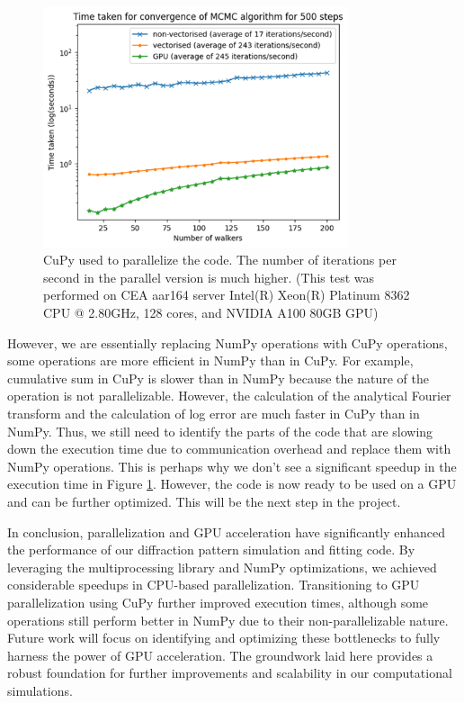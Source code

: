 \begin{figure}[h]
    \centering
    \includegraphics[width=0.8\textwidth]{images/gpu.png}
    \caption{CuPy used to parallelize the code. The number of iterations per second in the parallel version is much higher. (This test was performed 
    on CEA aar164 server Intel(R) Xeon(R) Platinum 8362 CPU @ 2.80GHz, 128 cores, and NVIDIA A100 80GB GPU)}
    \label{fig:cupy}
\end{figure}

\FloatBarrier

However, we are essentially replacing NumPy operations with CuPy operations, some operations 
are more efficient in NumPy than in CuPy. For example, cumulative sum in CuPy is slower than in 
NumPy because the nature of the operation is not parallelizable. However, the calculation of the 
analytical Fourier transform and the calculation of log error are much faster in CuPy than in 
NumPy. Thus, we still need to identify the parts of the code that are slowing down the execution 
time due to communication overhead and replace them with NumPy operations. This is perhaps why 
we don't see a significant speedup in the execution time in Figure \ref{fig:cupy}. However, the 
code is now ready to be used on a GPU and can be further optimized. This will be the next step 
in the project.

\medskip

In conclusion, parallelization and GPU acceleration have significantly enhanced the performance
 of our diffraction pattern simulation and fitting code. By leveraging the multiprocessing 
 library and NumPy optimizations, we achieved considerable speedups in CPU-based parallelization. 
 Transitioning to GPU parallelization using CuPy further improved execution times, although some
  operations still perform better in NumPy due to their non-parallelizable nature. Future work 
  will focus on identifying and optimizing these bottlenecks to fully harness the power of GPU 
  acceleration. The groundwork laid here provides a robust foundation for further improvements 
  and scalability in our computational simulations.


